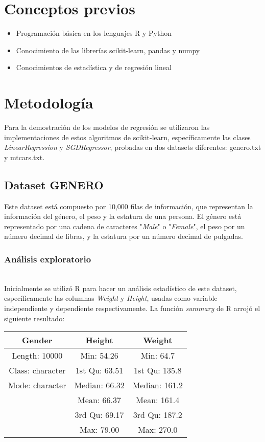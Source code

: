 \documentclass[sigconf,authorversion,nonacm]{acmart}
\begin{document}
\section{Conceptos previos}
\begin{itemize}
  \item Programación básica en los lenguajes R y Python
  \item Conocimiento de las librerías scikit-learn, pandas y numpy
  \item Conocimientos de estadística y de regresión lineal
\end{itemize}


\section{Metodología}
Para la demostración de los modelos de regresión se utilizaron las implementaciones de estos algoritmos de scikit-learn, específicamente las clases \textit{LinearRegression } y \textit{SGDRegressor}, probadas en dos datasets diferentes: genero.txt y mtcars.txt.

\subsection{Dataset GENERO}
Este dataset está compuesto por 10,000 filas de información, que representan la información del género, el peso y la estatura de una persona. El género está representado por una cadena de caracteres "\textit{Male}" o "\textit{Female}", el peso por un número decimal de libras, y la estatura por un número decimal de pulgadas.

\subsubsection{Análisis exploratorio}\hfill\\
Inicialmente se utilizó R para hacer un análisis estadístico de este dataset, específicamente las columnas \textit{Weight} y \textit{Height}, usadas como variable independiente y dependiente respectivamente.
La función \textit{summary} de R arrojó el siguiente resultado:
\begin{center}
\begin{tabular}{ |c|c|c| }
  \hline
  Gender & Height & Weight \\
  \hline
  Length: 10000 & Min: 54.26 & Min: 64.7 \\
  Class: character & 1st Qu: 63.51 & 1st Qu: 135.8 \\
  Mode: character & Median: 66.32 & Median: 161.2 \\
   & Mean: 66.37 & Mean: 161.4 \\
   & 3rd Qu: 69.17 & 3rd Qu: 187.2 \\
   & Max: 79.00 & Max: 270.0 \\
  \hline
\end{tabular}
\end{center}
\end{document}
